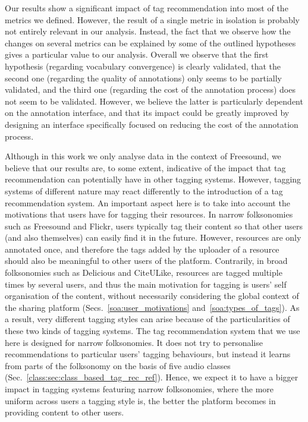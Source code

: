 Our results show a significant impact of tag recommendation into most of the metrics we defined. However, the result of a single metric in isolation is probably not entirely relevant in our analysis. Instead, the fact that we observe how the changes on several metrics can be explained by some of the outlined hypotheses gives a particular value to our analysis. Overall we observe that the first hypothesis (regarding vocabulary convergence) is clearly validated, that the second one (regarding the quality of annotations) only seems to be partially validated, and the third one (regarding the cost of the annotation process) does not seem to be validated.  However, we believe the latter is particularly dependent on the annotation interface, and that its impact could be greatly improved by designing an interface specifically focused on reducing the cost of the annotation process.

Although in this work we only analyse data in the context of Freesound, we believe that our results are, to some extent, indicative of the impact that tag recommendation can potentially have in other tagging systems.
However, tagging systems of different nature may react differently to the introduction of a tag recommendation system.
An important aspect here is to take into account the motivations that users have for tagging their resources.
In narrow folksonomies such as Freesound and Flickr, users typically tag their content so that other users (and also themselves) can easily find it in the future. However, resources are only annotated once, and therefore the tags added by the uploader of a resource should also be meaningful to other users of the platform. Contrarily, in broad folksonomies such as Delicious and CiteULike, resources are tagged multiple times by several users, and thus the main motivation for tagging is users' self organisation of the content, without necessarily considering the global context of the sharing platform (Secs.~\ref{soa:user_motivations} and~\ref{soa:types_of_tags}). 
As a result, very different tagging styles can arise because of the particularities of these two kinds of tagging systems.
The tag recommendation system that we use here is designed for narrow folksonomies. It does not try to personalise recommendations to particular users' tagging behaviours, but instead it learns from parts of the folksonomy on the basis of five audio classes (Sec.~\ref{class:sec:class_based_tag_rec_ref}).
Hence, we expect it to have a bigger impact in tagging systems featuring narrow folksonomies, where the more uniform across users a tagging style is, the better the platform becomes in providing content to other users.


